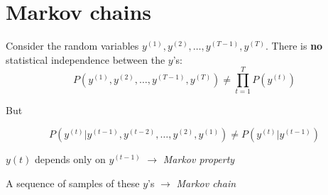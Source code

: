 \section{Markov chains}

\begin{frame} 
\end{frame}

\begin{frame}{\secname}

Consider the random variables $y^{(1)}, y^{(2)}, \ldots, y^{(T-1)}, y^{(T)}$.
There is \textbf{no} statistical independence between the $y$'s:
\begin{equation}
P(y^{(1)}, y^{(2)}, \ldots, y^{(T-1)}, y^{(T)}) \ne \prod_{t=1}^T P(y^{(t)})
\end{equation}

But

\begin{equation}
P(y^{(t)} | y^{(t-1)}, y^{(t-2)}, \ldots, y^{(2)}, y^{(1)}) \ne P(y^{(t)} | y^{(t-1)})
\end{equation}

$y{(t)}$ depends only on $y^{(t-1)}$ $\rightarrow$ \emph{Markov property}

A sequence of samples of these $y$'s $\rightarrow$ \emph{Markov chain}

\end{frame}
